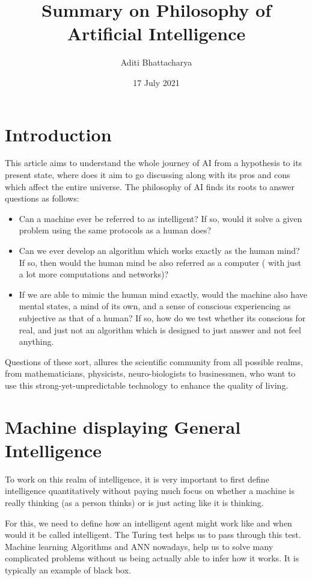 \documentclass{article}
\title{\textbf{Summary on Philosophy of Artificial Intelligence}}
\author{Aditi Bhattacharya}
\date{17 July 2021}
\begin{document}
\maketitle

\section{Introduction}

This article aims to understand the whole journey of AI from a hypothesis to its present state, where does it aim to go discussing along with its pros and cons which affect the entire universe. 
The philosophy of AI finds its roots to answer questions as follows:
\begin{itemize}
\item Can a machine ever be referred to as intelligent? If so, would it solve a given problem using the same protocols as a human does?
\item Can we ever develop an algorithm which works exactly as the human mind? If so, then would the human mind be also referred as a computer ( with just a lot more computations and networks)?
\item If we are able to mimic the human mind exactly, would the machine also have mental states, a mind of its own, and a sense of conscious experiencing as subjective as that of a human? If so, how do we test whether its conscious for real, and just not an algorithm which is designed to just answer and not feel anything. 
\end{itemize}
Questions of these sort, allures the scientific community from all possible realms, from mathematicians, physicists, neuro-biologists to businessmen, who want to use this strong-yet-unpredictable technology to enhance the quality of living. 

\section{Machine displaying General Intelligence}
To work on this realm of intelligence, it is very important to first define intelligence quantitatively without paying much focus on whether a machine is really thinking (as a person thinks) or is just acting like it is thinking.

For this, we need to define how an intelligent agent might work like and when would it be called intelligent. The Turing test helps us to pass through this test. Machine learning Algorithms and ANN nowadays, help us to solve many complicated problems without us being actually able to infer how it works. It is typically an example of black box.
\end{document}
